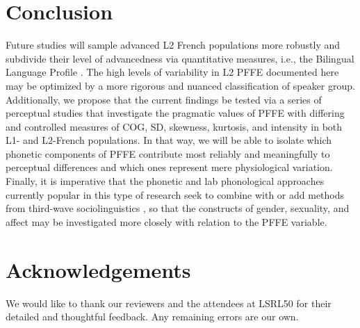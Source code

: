 \documentclass[output=paper,colorlinks,citecolor=brown,draftmode]{langscibook}
\begin{document}
\section{Conclusion}
Future studies will sample advanced L2 French populations more robustly and subdivide their level of advancedness via quantitative measures, i.e., the Bilingual Language Profile \citep{birdsong2012bilingual}. The high levels of variability in L2 PFFE documented here may be optimized by a more rigorous and nuanced classification of speaker group. Additionally, we propose that the current findings be tested via a series of perceptual studies that investigate the pragmatic values of PFFE with differing and controlled measures of COG, SD, skewness, kurtosis, and intensity in both L1- and L2-French populations. In that way, we will be able to isolate which phonetic components of PFFE contribute most reliably and meaningfully to perceptual differences and which ones represent mere physiological variation. Finally, it is imperative that the phonetic and lab phonological approaches currently popular in this type of research seek to combine with or add methods from third-wave sociolinguistics \citep{eckert2012three}, so that the constructs of gender, sexuality, and affect may be investigated more closely with relation to the PFFE variable.

\section*{Acknowledgements}
We would like to thank our reviewers and the attendees at LSRL50 for their detailed and thoughtful feedback. Any remaining errors are our own.

\printbibliography[heading=subbibliography,notkeyword=this]
\end{document}
